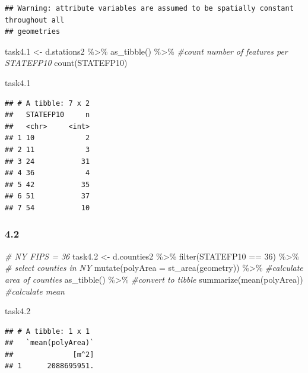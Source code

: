 \documentclass[
]{article}
\newenvironment{Shaded}{\begin{snugshade}}{\end{snugshade}}
\newcommand{\AttributeTok}[1]{\textcolor[rgb]{0.77,0.63,0.00}{#1}}
\newcommand{\CommentTok}[1]{\textcolor[rgb]{0.56,0.35,0.01}{\textit{#1}}}
\newcommand{\DecValTok}[1]{\textcolor[rgb]{0.00,0.00,0.81}{#1}}
\newcommand{\FloatTok}[1]{\textcolor[rgb]{0.00,0.00,0.81}{#1}}
\newcommand{\FunctionTok}[1]{\textcolor[rgb]{0.00,0.00,0.00}{#1}}
\newcommand{\NormalTok}[1]{#1}
\newcommand{\OtherTok}[1]{\textcolor[rgb]{0.56,0.35,0.01}{#1}}
\newcommand{\SpecialCharTok}[1]{\textcolor[rgb]{0.00,0.00,0.00}{#1}}
\begin{document}
\begin{verbatim}
## Warning: attribute variables are assumed to be spatially constant throughout all
## geometries
\end{verbatim}

\begin{Shaded}
\begin{Highlighting}[]
\NormalTok{task4}\FloatTok{.1} \OtherTok{\textless{}{-}}\NormalTok{ d.stations2 }\SpecialCharTok{\%\textgreater{}\%} \FunctionTok{as\_tibble}\NormalTok{() }\SpecialCharTok{\%\textgreater{}\%} \CommentTok{\#count number of features per STATEFP10}
  \FunctionTok{count}\NormalTok{(STATEFP10)}

\NormalTok{task4}\FloatTok{.1}
\end{Highlighting}
\end{Shaded}

\begin{verbatim}
## # A tibble: 7 x 2
##   STATEFP10     n
##   <chr>     <int>
## 1 10            2
## 2 11            3
## 3 24           31
## 4 36            4
## 5 42           35
## 6 51           37
## 7 54           10
\end{verbatim}

\hypertarget{section-9}{%
\subsubsection{4.2}\label{section-9}}

\begin{Shaded}
\begin{Highlighting}[]
\CommentTok{\# NY FIPS = 36}
\NormalTok{task4}\FloatTok{.2} \OtherTok{\textless{}{-}}\NormalTok{ d.counties2 }\SpecialCharTok{\%\textgreater{}\%} \FunctionTok{filter}\NormalTok{(STATEFP10 }\SpecialCharTok{==} \DecValTok{36}\NormalTok{) }\SpecialCharTok{\%\textgreater{}\%} \CommentTok{\# select counties in NY}
  \FunctionTok{mutate}\NormalTok{(}\AttributeTok{polyArea =} \FunctionTok{st\_area}\NormalTok{(geometry)) }\SpecialCharTok{\%\textgreater{}\%}  \CommentTok{\#calculate area of counties}
  \FunctionTok{as\_tibble}\NormalTok{() }\SpecialCharTok{\%\textgreater{}\%} \CommentTok{\#convert to tibble}
  \FunctionTok{summarize}\NormalTok{(}\FunctionTok{mean}\NormalTok{(polyArea)) }\CommentTok{\#calculate mean}

\NormalTok{task4}\FloatTok{.2}
\end{Highlighting}
\end{Shaded}

\begin{verbatim}
## # A tibble: 1 x 1
##   `mean(polyArea)`
##              [m^2]
## 1      2088695951.
\end{verbatim}
\end{document}
